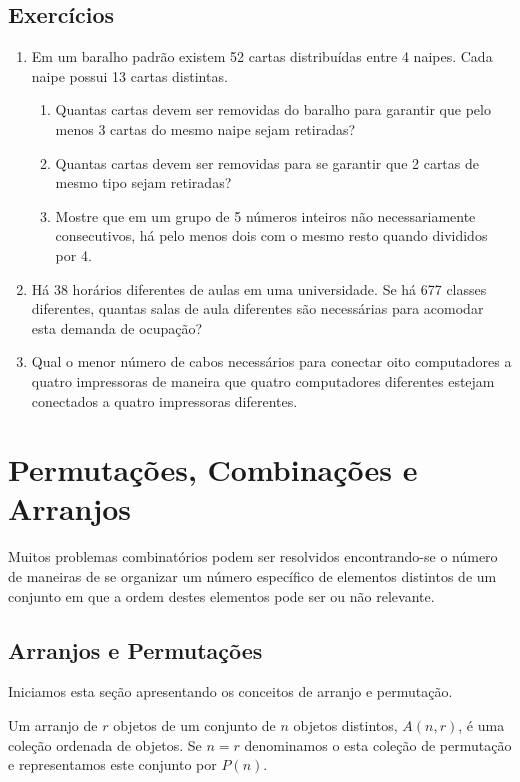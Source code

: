 \subsection{Exercícios}

\begin{enumerate}
  \item Em um baralho padrão existem 52 cartas distribuídas entre 4
    naipes. Cada naipe possui 13 cartas distintas.
  \begin{enumerate}
    \item Quantas cartas devem ser removidas do baralho para garantir
      que pelo menos 3 cartas do mesmo naipe sejam retiradas?
    \item Quantas cartas devem ser removidas para se garantir que 2
      cartas de mesmo tipo sejam retiradas?
    \item Mostre que em um grupo de 5 números inteiros não
      necessariamente consecutivos, há pelo menos dois com o mesmo
      resto quando divididos por 4.
  \end{enumerate}
  \item Há 38 horários diferentes de aulas em uma universidade. Se há
    677 classes diferentes, quantas salas de aula diferentes são
    necessárias para acomodar esta demanda de ocupação?
  \item Qual o menor número de cabos necessários para conectar oito
    computadores a quatro impressoras de maneira que quatro
    computadores diferentes estejam conectados a quatro impressoras diferentes.
\end{enumerate}

\section{Permutações, Combinações e Arranjos}

Muitos problemas combinatórios podem ser resolvidos encontrando-se o
número de maneiras de se organizar um número específico de elementos
distintos de um conjunto em que a ordem destes elementos pode ser ou
não relevante.

\subsection{Arranjos e Permutações}

Iniciamos esta seção apresentando os conceitos de arranjo e permutação.

\begin{Definition}
Um arranjo de $r$ objetos de um conjunto de $n$ objetos distintos,
$A(n,r)$, é uma coleção ordenada de objetos. Se $n = r$ denominamos o
esta coleção de permutação e representamos este conjunto por $P(n)$.
\end{Definition}


